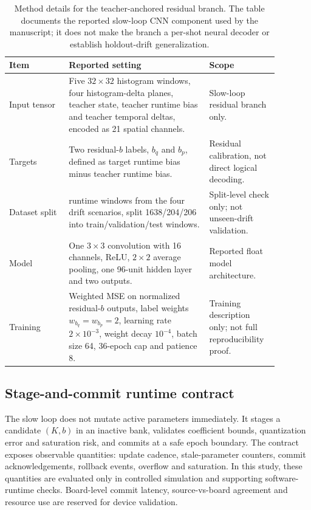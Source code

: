 \documentclass[11pt]{article}
\newcommand{\softwarehil}{controlled simulation}
\begin{document}
\begin{table}[htbp]
\centering
\small
\begin{tabular}{@{}>{\raggedright\arraybackslash}p{0.20\linewidth}>{\raggedright\arraybackslash}p{0.47\linewidth}>{\raggedright\arraybackslash}p{0.21\linewidth}@{}}
\toprule
Item & Reported setting & Scope \\
\midrule
Input tensor & Five \(32\times32\) histogram windows, four histogram-delta
planes, teacher state, teacher runtime bias and teacher temporal deltas,
encoded as 21 spatial channels. & Slow-loop residual branch only. \\
\addlinespace
Targets & Two residual-\(b\) labels, \(b_q\) and \(b_p\), defined as target
runtime bias minus teacher runtime bias. & Residual calibration, not direct
logical decoding. \\
\addlinespace
Dataset split & 2048 runtime windows from the four drift scenarios, split
1638/204/206 into train/validation/test windows. & Split-level check only;
not unseen-drift validation. \\
\addlinespace
Model & One \(3\times3\) convolution with 16 channels, ReLU, \(2\times2\)
average pooling, one 96-unit hidden layer and two outputs. & Reported float
model architecture. \\
\addlinespace
Training & Weighted MSE on normalized residual-\(b\) outputs, label weights
\(w_{b_q}=w_{b_p}=2\), learning rate \(2\times10^{-3}\), weight decay
\(10^{-4}\), batch size 64, 36-epoch cap and patience 8. & Training
description only; not full reproducibility proof. \\
\bottomrule
\end{tabular}
\caption{Method details for the teacher-anchored residual branch.  The table
documents the reported slow-loop CNN component used by the manuscript; it
does not make the branch a per-shot neural decoder or establish holdout-drift
generalization.}
\label{tab:cnn-branch-details}
\end{table}

\subsection{Stage-and-commit runtime contract}

The slow loop does not mutate active parameters immediately.  It stages a
candidate \((K,b)\) in an inactive bank, validates coefficient bounds,
quantization error and saturation risk, and commits at a safe epoch boundary.
The contract exposes observable quantities: update cadence, stale-parameter
counters, commit acknowledgements, rollback events, overflow and saturation.
In this study, these quantities are evaluated only in \softwarehil{} and
supporting software-runtime checks.  Board-level commit latency,
source-vs-board agreement and resource use are reserved for device validation.
\end{document}

